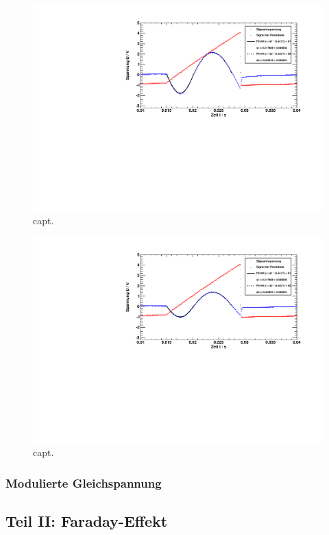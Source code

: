 \begin{figure}[H]
\begin{center}
  \includegraphics[width=15cm]{../img/pock_saege_winkel2.pdf}
  \caption{capt.}
  \label{img:pock_saege_winkel2}
\end{center}
\end{figure}

\begin{figure}[H]
\begin{center}
  \includegraphics[width=15cm]{../img/pock_saege_winkel3.pdf}
  \caption{capt.}
  \label{img:pock_saege_winkel3}
\end{center}
\end{figure}

\subsubsection{Modulierte Gleichspannung}

\subsection{Teil II: Faraday-Effekt}